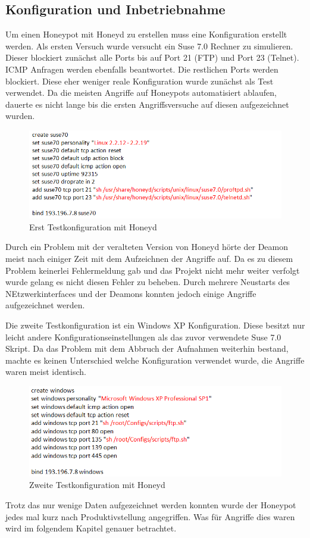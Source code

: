 \subsection{Konfiguration und Inbetriebnahme}
Um einen Honeypot mit Honeyd zu erstellen muss eine Konfiguration erstellt werden. Als ersten Versuch wurde versucht ein Suse 7.0 Rechner zu simulieren. Dieser blockiert zunächst alle Ports bis auf Port 21 (FTP) und Port 23 (Telnet). ICMP Anfragen werden ebenfalls beantwortet. Die restlichen Ports werden blockiert. Diese eher weniger reale Konfiguration wurde zunächst als Test verwendet. Da die meisten Angriffe auf Honeypots automatisiert ablaufen, dauerte es nicht lange bis die ersten Angriffsversuche auf diesen aufgezeichnet wurden.\\

\begin{figure}[ht]
    \centering\includegraphics[scale=0.7]{Bilder/Suse70.png}
  \caption{Erst Testkonfiguration mit Honeyd}
  \label{suse70}
\end{figure}

Durch ein Problem mit der veralteten Version von Honeyd hörte der Deamon meist nach einiger Zeit mit dem Aufzeichnen der Angriffe auf. Da es zu diesem Problem keinerlei Fehlermeldung gab und das Projekt nicht mehr weiter verfolgt wurde gelang es nicht diesen Fehler zu beheben. Durch mehrere Neustarts des NEtzwerkinterfaces und der Deamons konnten jedoch einige Angriffe aufgezeichnet werden. 

Die zweite Testkonfiguration ist ein Windows XP Konfiguration. Diese besitzt nur leicht andere Konfigurationseinstellungen als das zuvor verwendete Suse 7.0 Skript. Da das Problem mit dem Abbruch der Aufnahmen weiterhin bestand, machte es keinen Unterschied welche Konfiguration verwendet wurde, die Angriffe waren meist identisch.\\

\begin{figure}[ht]
    \centering\includegraphics[scale=0.7]{Bilder/WinXP.png}
  \caption{Zweite Testkonfiguration mit Honeyd}
  \label{winXP}
\end{figure}

\noindent Trotz das nur wenige Daten aufgezeichnet werden konnten wurde der Honeypot jedes mal kurz nach Produktivstellung angegriffen. Was für Angriffe dies waren wird im folgendem Kapitel genauer betrachtet.